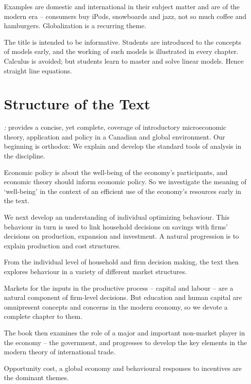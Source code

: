 Examples are domestic and international in their subject matter and are of the modern era -- consumers buy iPods, snowboards and jazz, not so much coffee and hamburgers. Globalization is a recurring theme.

The title is intended to be informative. Students are introduced to the concepts of models early, and the working of such models is illustrated in every chapter. Calculus is avoided; but students learn to master and solve linear models. Hence straight line equations.

\newpage 

\section*{Structure of the Text}

\emph{\booktitle: \booksubtitle} provides a concise, yet complete, coverage of introductory microeconomic theory, application and policy in a Canadian and global environment. Our beginning is orthodox: We explain and develop the standard tools of analysis in the discipline.

Economic policy is about the well-being of the economy's participants, and economic theory should inform economic policy. So we investigate the meaning of `well-being' in the context of an efficient use of the economy's resources early in the text.

We next develop an understanding of individual optimizing behaviour. This behaviour in turn is used to link household decisions on savings with firms' decisions on production, expansion and investment. A natural progression is to explain production and cost structures.

From the individual level of household and firm decision making, the text then explores behaviour in a variety of different market structures.

Markets for the inputs in the productive process -- capital and labour -- are a natural component of firm-level decisions. But education and human capital are omnipresent concepts and concerns in the modern economy, so we devote a complete chapter to them.

The book then examines the role of a major and important non-market player in the economy -- the government, and progresses to develop the key elements in the modern theory of international trade.

Opportunity cost, a global economy and behavioural responses to incentives are the dominant themes.
